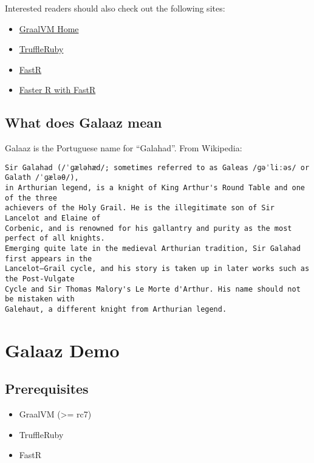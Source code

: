 \documentclass[]{article}
\providecommand{\tightlist}{%
  \setlength{\itemsep}{0pt}\setlength{\parskip}{0pt}}
\begin{document}
Interested readers should also check out the following sites:

\begin{itemize}
\tightlist
\item
  \href{https://www.graalvm.org/}{GraalVM Home}
\item
  \href{https://github.com/oracle/truffleruby}{TruffleRuby}
\item
  \href{https://github.com/oracle/fastr}{FastR}
\item
  \href{https://medium.com/graalvm/faster-r-with-fastr-4b8db0e0dceb}{Faster
  R with FastR}
\end{itemize}

\subsection{What does Galaaz mean}\label{what-does-galaaz-mean}

Galaaz is the Portuguese name for ``Galahad''. From Wikipedia:

\begin{verbatim}
Sir Galahad (/ˈɡæləhæd/; sometimes referred to as Galeas /ɡəˈliːəs/ or Galath /ˈɡæləθ/),
in Arthurian legend, is a knight of King Arthur's Round Table and one of the three
achievers of the Holy Grail. He is the illegitimate son of Sir Lancelot and Elaine of
Corbenic, and is renowned for his gallantry and purity as the most perfect of all knights.
Emerging quite late in the medieval Arthurian tradition, Sir Galahad first appears in the
Lancelot–Grail cycle, and his story is taken up in later works such as the Post-Vulgate
Cycle and Sir Thomas Malory's Le Morte d'Arthur. His name should not be mistaken with
Galehaut, a different knight from Arthurian legend. 
\end{verbatim}

\section{Galaaz Demo}\label{galaaz-demo}

\subsection{Prerequisites}\label{prerequisites}

\begin{itemize}
\tightlist
\item
  GraalVM (\textgreater{}= rc7)
\item
  TruffleRuby
\item
  FastR
\end{itemize}
\end{document}
